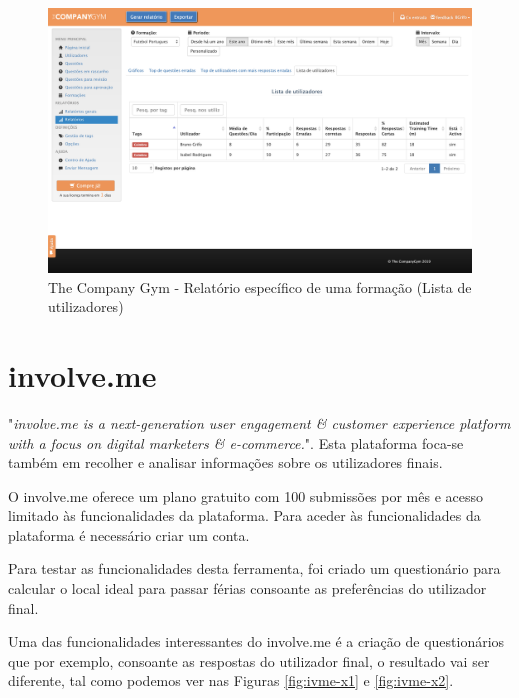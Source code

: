 \newpage
\begin{figure}[ht!]
	\begin{center}
		\includegraphics[width=1\textwidth]{img/tcg/tcg-data-f3.png}
		\caption{The Company Gym - Relatório específico de uma formação (Lista de utilizadores)}
		\label{fig:tcg-data-f3}
	\end{center}
\end{figure}



\section{involve.me}
\label{involveme}


"\textit{involve.me is a next-generation user engagement \& customer experience platform with a focus on digital marketers \& e-commerce.}"\cite{involve}.
Esta plataforma foca-se também em recolher e analisar informações sobre os utilizadores finais.

O involve.me oferece um plano gratuito com 100 submissões por mês e acesso limitado às funcionalidades da plataforma. Para aceder às funcionalidades da plataforma é necessário criar um conta.

Para testar as funcionalidades desta ferramenta, foi criado um questionário para calcular o local ideal para passar férias consoante as preferências do utilizador final. 


Uma das funcionalidades interessantes do involve.me é a criação de questionários que por exemplo, consoante as respostas do utilizador final, o resultado vai ser diferente, tal como podemos ver nas Figuras \ref{fig:ivme-x1} e \ref{fig:ivme-x2}.
\newpage


